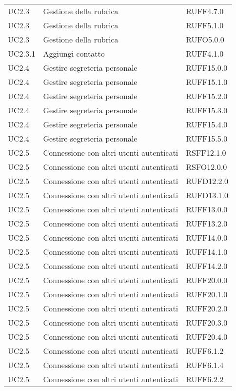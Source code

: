 \begin{longtable}{lp{}l}
UC2.3 & Gestione della rubrica & RUFF4.7.0 \\
UC2.3 & Gestione della rubrica & RUFF5.1.0 \\
UC2.3 & Gestione della rubrica & RUFO5.0.0 \\
UC2.3.1 & Aggiungi contatto & RUFF4.1.0 \\
UC2.4 & Gestire segreteria personale & RUFF15.0.0 \\
UC2.4 & Gestire segreteria personale & RUFF15.1.0 \\
UC2.4 & Gestire segreteria personale & RUFF15.2.0 \\
UC2.4 & Gestire segreteria personale & RUFF15.3.0 \\
UC2.4 & Gestire segreteria personale & RUFF15.4.0 \\
UC2.4 & Gestire segreteria personale & RUFF15.5.0 \\
UC2.5 & Connessione con altri utenti autenticati & RSFF12.1.0 \\
UC2.5 & Connessione con altri utenti autenticati & RSFO12.0.0 \\
UC2.5 & Connessione con altri utenti autenticati & RUFD12.2.0 \\
UC2.5 & Connessione con altri utenti autenticati & RUFD13.1.0 \\
UC2.5 & Connessione con altri utenti autenticati & RUFF13.0.0 \\
UC2.5 & Connessione con altri utenti autenticati & RUFF13.2.0 \\
UC2.5 & Connessione con altri utenti autenticati & RUFF14.0.0 \\
UC2.5 & Connessione con altri utenti autenticati & RUFF14.1.0 \\
UC2.5 & Connessione con altri utenti autenticati & RUFF14.2.0 \\
UC2.5 & Connessione con altri utenti autenticati & RUFF20.0.0 \\
UC2.5 & Connessione con altri utenti autenticati & RUFF20.1.0 \\
UC2.5 & Connessione con altri utenti autenticati & RUFF20.2.0 \\
UC2.5 & Connessione con altri utenti autenticati & RUFF20.3.0 \\
UC2.5 & Connessione con altri utenti autenticati & RUFF20.4.0 \\
UC2.5 & Connessione con altri utenti autenticati & RUFF6.1.2 \\
UC2.5 & Connessione con altri utenti autenticati & RUFF6.1.4 \\
UC2.5 & Connessione con altri utenti autenticati & RUFF6.2.2 \\

\end{longtable}
